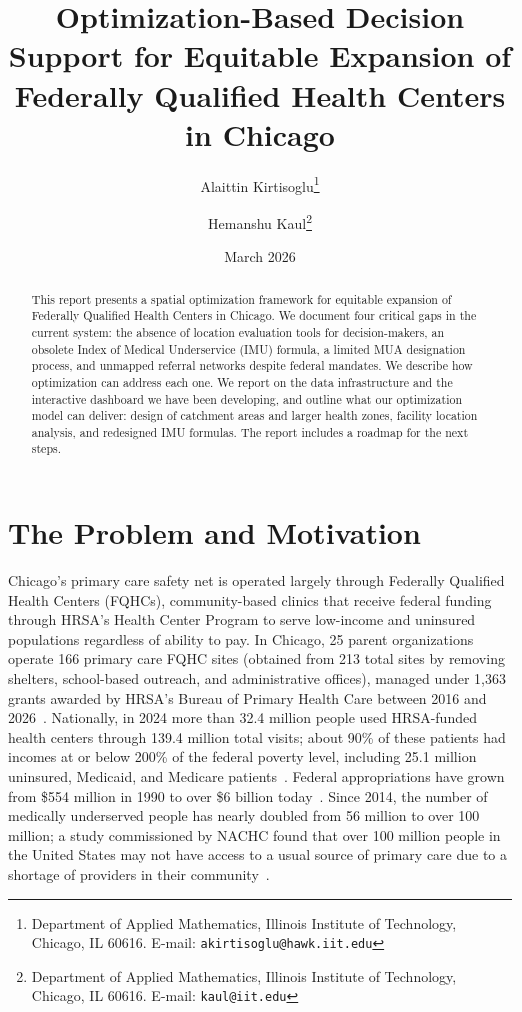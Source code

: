 \documentclass[11pt]{article}
\title{Optimization-Based Decision Support for Equitable Expansion of\\
Federally Qualified Health Centers in Chicago}
\author{Alaittin Kirtisoglu\thanks{Department of Applied Mathematics,
Illinois Institute of Technology, Chicago, IL 60616.
E-mail: \texttt{akirtisoglu@hawk.iit.edu}} \and
Hemanshu Kaul\thanks{Department of Applied Mathematics,
Illinois Institute of Technology, Chicago, IL 60616.
E-mail: \texttt{kaul@iit.edu}}}
\date{March 2026}
\begin{document}
\maketitle

\begin{abstract}
\noindent This report presents a spatial optimization framework for equitable expansion of Federally Qualified 
Health Centers in Chicago. We document four critical gaps in the current system: the absence of location evaluation 
tools for decision-makers, an obsolete Index of Medical Underservice (IMU) formula, a limited MUA designation process, and 
unmapped referral networks despite federal mandates. We describe how optimization can address each 
one. We report on the data infrastructure and the interactive dashboard we have been developing, and outline what 
our optimization model can deliver: design of catchment areas and larger health zones, facility location analysis, and redesigned 
IMU formulas. The report includes a roadmap for the next steps.
\end{abstract}

\vspace{6pt}
\tableofcontents
\newpage

\section{The Problem and Motivation}\label{sec:problem}

Chicago's primary care safety net is operated largely through Federally Qualified Health Centers (FQHCs), 
community-based clinics that receive federal funding through HRSA's Health Center Program to serve low-income 
and uninsured populations regardless of ability to pay. In Chicago, 25 parent organizations operate 166 primary 
care FQHC sites (obtained from 213 total sites by removing shelters, school-based outreach, and administrative 
offices), managed under 1,363 grants awarded by HRSA's Bureau of Primary Health Care between 2016 and 
2026~\cite{hrsa2026data}. Nationally, in 2024 more than 32.4 million people used HRSA-funded health centers 
through 139.4 million total visits; about 90\% of these patients had incomes at or below 200\% of the federal 
poverty level, including 25.1 million uninsured, Medicaid, and Medicare patients~\cite{hrsa2026data}. Federal 
appropriations have grown from \$554 million in 1990 to over \$6 billion today~\cite{crs2017healthcenters}. 
Since 2014, the number of medically underserved people has nearly doubled from 56 million to over 100 million; 
a study commissioned by NACHC found that over 100 million people in the United States may not have access
to a usual source of primary care due to a shortage of providers in their
community~\cite{NACHC2014}. 
\end{document}
